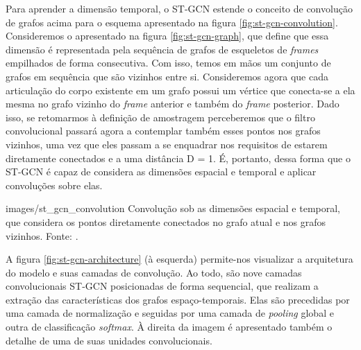 
Para aprender a dimensão temporal, o ST-GCN estende o conceito de convolução de grafos acima para o esquema apresentado na figura \ref{fig:st-gcn-convolution}. Consideremos o apresentado na figura \ref{fig:st-gcn-graph}, que define que essa dimensão é representada pela sequência de grafos de esqueletos de \textit{frames} empilhados de forma consecutiva. Com isso, temos em mãos um conjunto de grafos em sequência que são vizinhos entre si. Consideremos agora que cada articulação do corpo existente em um grafo possui um vértice que conecta-se a ela mesma no grafo vizinho do \textit{frame} anterior e também do \textit{frame} posterior. Dado isso, se retomarmos à definição de amostragem perceberemos que o filtro convolucional passará agora a contemplar também esses pontos nos grafos vizinhos, uma vez que eles passam a se enquadrar nos requisitos de estarem diretamente conectados e a uma distância D = 1. É, portanto, dessa forma que o ST-GCN é capaz de considera as dimensões espacial e temporal e aplicar convoluções sobre elas.

    {images/st_gcn_convolution}
    {Convolução sob as dimensões espacial e temporal, que considera os pontos diretamente conectados no grafo atual e nos grafos vizinhos. Fonte: \cite[p. 3]{st-gcn-2018}.}



A figura \ref{fig:st-gcn-architecture} (à esquerda) permite-nos visualizar a arquitetura do modelo e suas camadas de convolução. Ao todo, são nove camadas convolucionais ST-GCN posicionadas de forma sequencial, que realizam a extração das características dos grafos espaço-temporais. Elas são precedidas por uma camada de normalização e seguidas por uma camada de \textit{pooling} global e outra de classificação \textit{softmax}. À direita da imagem é apresentado também o detalhe de uma de suas unidades convolucionais.

